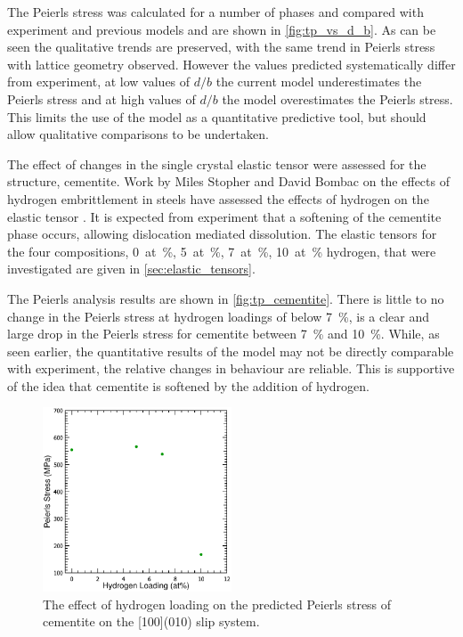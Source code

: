 The Peierls stress was calculated for a number of phases  and compared with experiment and previous models and are shown in \autoref{fig:tp_vs_d_b}. As can be seen the qualitative trends are preserved, with the same trend in Peierls stress with lattice geometry observed. However the values predicted systematically differ from experiment, at low values of $d/b$ the current model underestimates the Peierls stress and at high values of $d/b$ the model overestimates the Peierls stress. This limits the use of the model as a quantitative predictive tool, but should allow qualitative comparisons to be undertaken.

The effect of changes in the single crystal elastic tensor were assessed for the  structure, cementite. Work by Miles Stopher and David Bombac on the effects of hydrogen embrittlement in steels have assessed the effects of hydrogen on the elastic tensor \cite{Stopher2017}. It is expected from experiment \cite{Stopher2017} that a softening of the cementite phase occurs, allowing dislocation mediated dissolution. The elastic tensors for the four compositions, \SI{0}{at\percent}, \SI{5}{at\percent}, \SI{7}{at\percent}, \SI{10}{at\percent} hydrogen, that were investigated are given in \autoref{sec:elastic_tensors}.



The Peierls analysis results are shown in \autoref{fig:tp_cementite}. There is little to no change in the Peierls stress at hydrogen loadings of below \SI{7}{\percent}, is a clear and large drop in the Peierls stress for cementite between \SI{7}{\percent} and \SI{10}{\percent}. While, as seen earlier, the quantitative results of the model may not be directly comparable with experiment, the relative changes in behaviour are reliable. This is supportive of the idea that cementite is softened by the addition of hydrogen.
\begin{figure}
\captionsetup{width=0.6\textwidth}
\centering
\includegraphics[width=0.5\textwidth]{Peierls_Stress_Cementite}
\caption{The effect of hydrogen loading on the predicted Peierls stress of cementite on the [100](010) slip system.\label{fig:tp_cementite}}
\end{figure}


